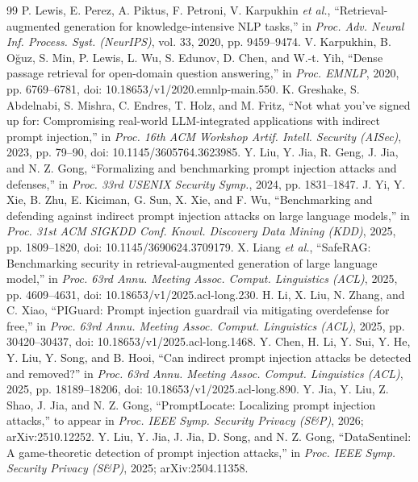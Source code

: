 \documentclass[conference]{IEEEtran}
\begin{document}
\begin{thebibliography}{99}
 P. Lewis, E. Perez, A. Piktus, F. Petroni, V. Karpukhin \emph{et al.}, ``Retrieval-augmented generation for knowledge-intensive NLP tasks,'' in \emph{Proc. Adv. Neural Inf. Process. Syst. (NeurIPS)}, vol. 33, 2020, pp. 9459--9474.
 V. Karpukhin, B. O\u{g}uz, S. Min, P. Lewis, L. Wu, S. Edunov, D. Chen, and W.-t. Yih, ``Dense passage retrieval for open-domain question answering,'' in \emph{Proc. EMNLP}, 2020, pp. 6769--6781, doi: 10.18653/v1/2020.emnlp-main.550.
 K. Greshake, S. Abdelnabi, S. Mishra, C. Endres, T. Holz, and M. Fritz, ``Not what you've signed up for: Compromising real-world LLM-integrated applications with indirect prompt injection,'' in \emph{Proc. 16th ACM Workshop Artif. Intell. Security (AISec)}, 2023, pp. 79--90, doi: 10.1145/3605764.3623985.
 Y. Liu, Y. Jia, R. Geng, J. Jia, and N. Z. Gong, ``Formalizing and benchmarking prompt injection attacks and defenses,'' in \emph{Proc. 33rd USENIX Security Symp.}, 2024, pp. 1831--1847.
 J. Yi, Y. Xie, B. Zhu, E. Kiciman, G. Sun, X. Xie, and F. Wu, ``Benchmarking and defending against indirect prompt injection attacks on large language models,'' in \emph{Proc. 31st ACM SIGKDD Conf. Knowl. Discovery Data Mining (KDD)}, 2025, pp. 1809--1820, doi: 10.1145/3690624.3709179.
 X. Liang \emph{et al.}, ``SafeRAG: Benchmarking security in retrieval-augmented generation of large language model,'' in \emph{Proc. 63rd Annu. Meeting Assoc. Comput. Linguistics (ACL)}, 2025, pp. 4609--4631, doi: 10.18653/v1/2025.acl-long.230.
 H. Li, X. Liu, N. Zhang, and C. Xiao, ``PIGuard: Prompt injection guardrail via mitigating overdefense for free,'' in \emph{Proc. 63rd Annu. Meeting Assoc. Comput. Linguistics (ACL)}, 2025, pp. 30420--30437, doi: 10.18653/v1/2025.acl-long.1468.
 Y. Chen, H. Li, Y. Sui, Y. He, Y. Liu, Y. Song, and B. Hooi, ``Can indirect prompt injection attacks be detected and removed?'' in \emph{Proc. 63rd Annu. Meeting Assoc. Comput. Linguistics (ACL)}, 2025, pp. 18189--18206, doi: 10.18653/v1/2025.acl-long.890.
 Y. Jia, Y. Liu, Z. Shao, J. Jia, and N. Z. Gong, ``PromptLocate: Localizing prompt injection attacks,'' to appear in \emph{Proc. IEEE Symp. Security Privacy (S\&P)}, 2026; arXiv:2510.12252.
 Y. Liu, Y. Jia, J. Jia, D. Song, and N. Z. Gong, ``DataSentinel: A game-theoretic detection of prompt injection attacks,'' in \emph{Proc. IEEE Symp. Security Privacy (S\&P)}, 2025; arXiv:2504.11358.

\end{thebibliography}
\end{document}
